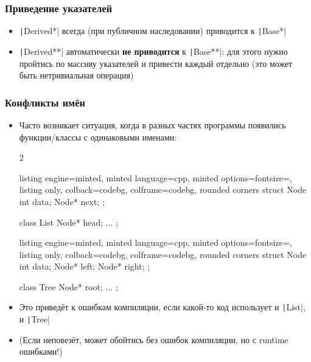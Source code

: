 \documentclass[10pt]{beamer}
\begin{document}
\begin{frame}[fragile]
\frametitle{Приведение указателей}
\begin{itemize}
\item \texttt|Derived*| всегда (при публичном наследовании) приводится к \texttt|Base*|
\pause
\item \texttt|Derived**| автоматически \textbf{не приводится} к \texttt|Base**|: для этого нужно пройтись по массиву указателей и привести каждый отдельно (это может быть нетривиальная операция)
\end{itemize}
\end{frame}

\begin{frame}[fragile]
\frametitle{Конфликты имён}
\begin{itemize}
\item Часто возникает ситуация, когда в разных частях программы появились функции/классы с одинаковыми именами:
\begin{multicols}{2}
\begin{tcblisting}{listing engine=minted, minted language=cpp, minted options={fontsize=\scriptsize}, listing only, colback=codebg, colframe=codebg, rounded corners}
struct Node {
  int data;
  Node* next;
};


class List {
  Node* head;
  ...
};
\end{tcblisting}
\begin{tcblisting}{listing engine=minted, minted language=cpp, minted options={fontsize=\scriptsize}, listing only, colback=codebg, colframe=codebg, rounded corners}
struct Node {
  int data;
  Node* left;
  Node* right;
};

class Tree {
  Node* root;
  ...
};
\end{tcblisting}
\end{multicols}
\pause
\item Это приведёт к ошибкам компиляции, если какой-то код использует и \texttt|List|, и \texttt|Tree|
\pause
\item (Если неповезёт, может обойтись без ошибок компиляции, но с runtime ошибками!)
\end{itemize}
\end{frame}
\end{document}

